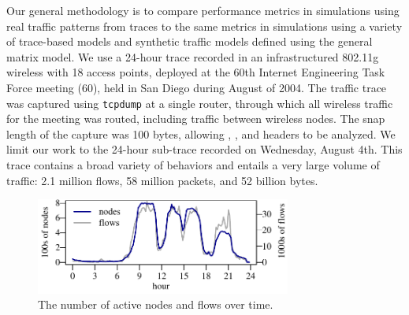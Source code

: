 \documentclass[twocolumn,final]{svjour3}
\newcommand{\caps}[1]{{\smaller{#1}}}
\begin{document}
Our general methodology is to compare performance metrics in simulations using real traffic patterns from traces to the same metrics in simulations using a variety of trace-based models and synthetic traffic models defined using the general matrix model. We use a 24-hour trace recorded in an infrastructured 802.11g wireless \caps{LAN} with 18 access points, deployed at the 60th Internet Engineering Task Force meeting (\caps{IETF}60), held in San Diego during August of 2004. The traffic trace was captured using \texttt{\small{tcpdump}} at a single router, through which all wireless traffic for the meeting was routed, including traffic between wireless nodes. The snap length of the capture was 100 bytes, allowing \caps{IP}, \caps{ICMP}, \caps{UDP} and \caps{TCP} headers to be analyzed. We limit our work to the 24-hour sub-trace recorded on Wednesday, August 4th. This trace contains a broad variety of behaviors and entails a very large volume of traffic: 2.1 million flows, 58 million packets, and 52 billion bytes.

\begin{figure}[t]
\vspace{0.5em}
\begin{center}
\includegraphics[width=3.3in]{nodes-flows}%
\vspace{-1.25em}%
\caption{The number of active nodes and flows over time.} 
\label{fig:nodes-flows}
\end{center}
\vspace{-2em}
\end{figure}
\end{document}
